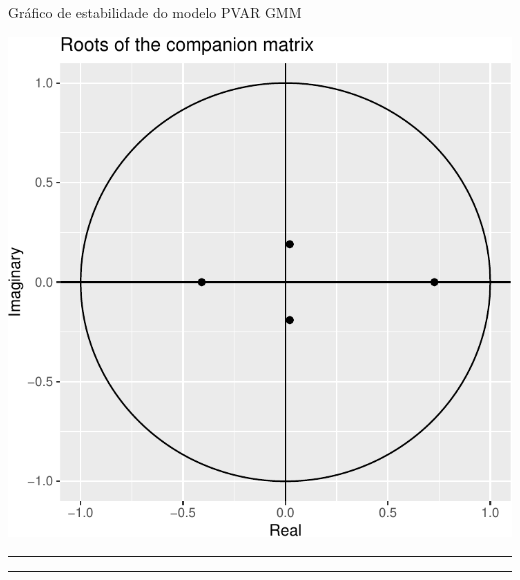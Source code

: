 \documentclass[12pt,12pt,openright,oneside,a4paper,chapter=TITLE,section=TITLE,subsection=TITLE,subsubsection=TITLE,english,french,spanish,portugues,sumario=tradicional]{abntex2}
\begin{document}
\begin{grafico}[!htbp]
\vspace{20pt}
\caption{Gráfico de estabilidade do modelo PVAR GMM}
\vspace{-7mm}

\begin{center}\includegraphics{12-exportedfigures/stability.plot-1} \end{center}
\vspace{-3mm}
\label{graf:stability}
\vspace{-2mm}
\end{grafico}

\begin{center}\rule{0.5\linewidth}{0.5pt}\end{center}

\begin{center}\rule{0.5\linewidth}{0.5pt}\end{center}

\printbibliography[title=\hspace{45pt}{REFERÊNCIAS}]
\end{document}

